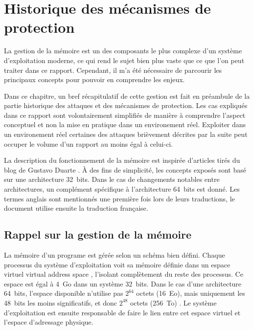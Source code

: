 \chapter{Historique des mécanismes de protection}
\label{chap:historique}

La gestion de la mémoire est un des composants le plus complexe d'un système d'exploitation moderne, ce qui rend le sujet bien plus vaste que ce que l'on peut traiter dans ce rapport. Cependant, il m'a été nécessaire de parcourir les principaux concepts pour pouvoir en comprendre les enjeux.

Dans ce chapitre, un bref récapitulatif de cette gestion est fait en préambule de la partie historique des attaques et des mécanismes de protection. Les cas expliqués dans ce rapport sont volontairement simplifiés de manière à comprendre l'aspect conceptuel et non la mise en pratique dans un environement réel. Exploiter dans un environement réel certaines des attaques brièvement décrites par la suite peut occuper le volume d'un rapport au moins égal à celui-ci.

La description du fonctionnement de la mémoire est inspirée d'articles tirés du blog de Gustavo Duarte \cite{AnatomyOfAProgramInMemory, HowTheKernelManagesYourMemory, JourneyToTheStackPartI}. À des fins de simplicité, les concepts exposés sont basé sur une architecture 32~bits. Dans le cas de changements notables entre architectures, un complément spécifique à l'architecture 64~bits est donné. Les termes anglais sont mentionnés une première fois lors de leurs traductions, le document utilise ensuite la traduction française.

\minitoc

\newpage

\section{Rappel sur la gestion de la mémoire}

La mémoire d'un programe est gérée selon un schéma bien défini. Chaque processus du système d'exploitation voit sa mémoire définie dans un espace virtuel \og virtual address space \fg, l'isolant complètement du reste des processus. Ce espace est égal à 4~Go dans un système 32~bits. Dans le cas d'une architecture 64~bits, l'espace disponible n'utilise pas $2^{64}$ octets (16~Eo), mais uniquement les 48~bits les moins significatifs, et donc $2^{48}$ octets (256~To) \cite{64bitComputing,VirtualAddressSpaceDetails}. Le système d'exploitation est ensuite responsable de faire le lien entre cet espace virtuel et l'espace d'adressage physique.

